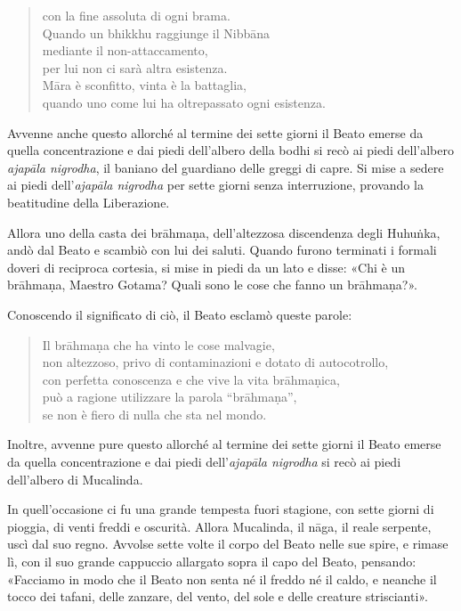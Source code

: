 \begin{quote}
con la fine assoluta di ogni brama. \\
Quando un bhikkhu raggiunge il Nibbāna \\
mediante il non-attaccamento, \\
per lui non ci sarà altra esistenza. \\
Māra è sconfitto, vinta è la battaglia, \\
quando uno come lui ha oltrepassato ogni esistenza.
\end{quote}


 Avvenne anche questo allorché al termine dei sette giorni
il Beato emerse da quella concentrazione e dai piedi dell’albero della bodhi si
recò ai piedi dell’albero \emph{ajapāla nigrodha}, il baniano del guardiano
delle greggi di capre. Si mise a sedere ai piedi dell’\emph{ajapāla nigrodha}
per sette giorni senza interruzione, provando la beatitudine della Liberazione.

Allora uno della casta dei brāhmaṇa, dell’altezzosa discendenza degli Huhuṅka,
andò dal Beato e scambiò con lui dei saluti. Quando furono terminati i formali
doveri di reciproca cortesia, si mise in piedi da un lato e disse: «Chi è un
brāhmaṇa, Maestro Gotama? Quali sono le cose che fanno un brāhmaṇa?».

Conoscendo il significato di ciò, il Beato esclamò queste parole:

\begin{quote}
Il brāhmaṇa che ha vinto le cose malvagie, \\
non altezzoso, privo di contaminazioni e dotato di autocotrollo, \\
con perfetta conoscenza e che vive la vita brāhmaṇica, \\
può a ragione utilizzare la parola “brāhmaṇa”, \\
se non è fiero di nulla che sta nel mondo.
\end{quote}


Inoltre, avvenne pure questo allorché al termine dei sette giorni il Beato
emerse da quella concentrazione e dai piedi dell’\emph{ajapāla nigrodha} si recò
ai piedi dell’albero di Mucalinda.

In quell’occasione ci fu una grande tempesta fuori stagione, con sette giorni di
pioggia, di venti freddi e oscurità. Allora Mucalinda, il nāga, il reale
serpente, uscì dal suo regno. Avvolse sette volte il corpo del Beato nelle sue
spire, e rimase lì, con il suo grande cappuccio allargato sopra il capo del
Beato, pensando: «Facciamo in modo che il Beato non senta né il freddo né il
caldo, e neanche il tocco dei tafani, delle zanzare, del vento, del sole e delle
creature striscianti».

